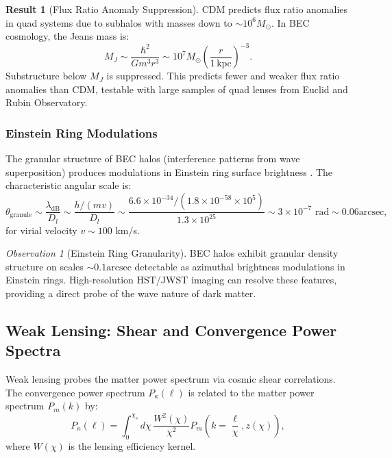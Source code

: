 \documentclass[11pt,a4paper]{article}
\newcommand{\ee}[1]{\times 10^{#1}}
\newcommand{\Msun}{\ensuremath{M_\odot}}
\newcommand{\kpc}{\ensuremath{\mathrm{kpc}}}
\newcommand{\arcsec}{\ensuremath{\text{arcsec}}}
\theoremstyle{definition}
\newtheorem{result}{Result}[section]
\theoremstyle{remark}
\newtheorem{observation}{Observation}[section]
\begin{document}
\begin{result}[Flux Ratio Anomaly Suppression]
\label{res:flux_ratio}
CDM predicts flux ratio anomalies in quad systems due to subhalos with masses down to $\sim 10^6 \Msun$. In BEC cosmology, the Jeans mass is:
\begin{equation}
M_J \sim \frac{\hbar^2}{Gm^3 r^3} \sim 10^7 \Msun \left(\frac{r}{1 \, \kpc}\right)^{-3}.
\end{equation}
Substructure below $M_J$ is suppressed. This predicts fewer and weaker flux ratio anomalies than CDM, testable with large samples of quad lenses from Euclid and Rubin Observatory.
\end{result}

\subsubsection{Einstein Ring Modulations}

The granular structure of BEC halos (interference patterns from wave superposition) produces modulations in Einstein ring surface brightness \cite{Amruth2023}. The characteristic angular scale is:
\begin{equation}
\theta_{\mathrm{granule}} \sim \frac{\lambda_{\mathrm{dB}}}{D_l} \sim \frac{h/(mv)}{D_l} \sim \frac{6.6 \ee{-34}/(1.8 \ee{-58} \times 10^5)}{1.3 \ee{25}} \sim 3 \ee{-7} \text{ rad} \sim 0.06\arcsec,
\end{equation}
for virial velocity $v \sim 100$ km/s.

\begin{observation}[Einstein Ring Granularity]
BEC halos exhibit granular density structure on scales $\sim 0.1\arcsec$ detectable as azimuthal brightness modulations in Einstein rings. High-resolution HST/JWST imaging can resolve these features, providing a direct probe of the wave nature of dark matter.
\end{observation}

\subsection{Weak Lensing: Shear and Convergence Power Spectra}
\label{sec:weak_lensing_obs}

Weak lensing probes the matter power spectrum via cosmic shear correlations. The convergence power spectrum $P_\kappa(\ell)$ is related to the matter power spectrum $P_m(k)$ by:
\begin{equation}
P_\kappa(\ell) = \int_0^{\chi_s} d\chi \, \frac{W^2(\chi)}{\chi^2} P_m\left(k = \frac{\ell}{\chi}, z(\chi)\right),
\end{equation}
where $W(\chi)$ is the lensing efficiency kernel.
\end{document}
